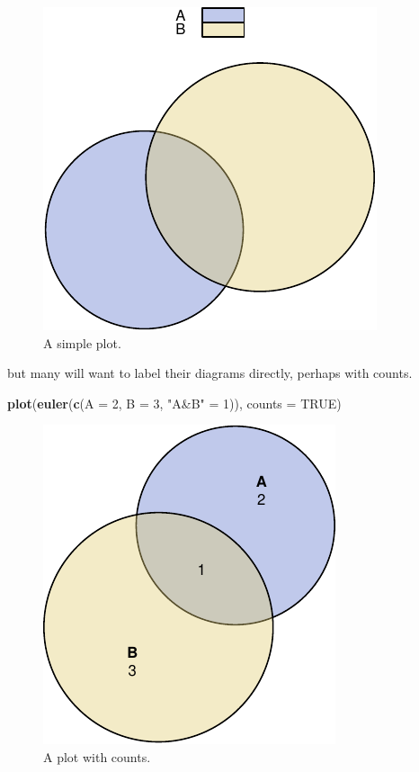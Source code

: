 \documentclass[
  headsepline=true,headings=standardclasses%
]{scrartcl}
\newenvironment{Shaded}{\begin{snugshade}}{\end{snugshade}}
\newcommand{\KeywordTok}[1]{\textcolor[rgb]{0.13,0.29,0.53}{\textbf{#1}}}
\newcommand{\DataTypeTok}[1]{\textcolor[rgb]{0.13,0.29,0.53}{#1}}
\newcommand{\DecValTok}[1]{\textcolor[rgb]{0.00,0.00,0.81}{#1}}
\newcommand{\StringTok}[1]{\textcolor[rgb]{0.31,0.60,0.02}{#1}}
\newcommand{\OtherTok}[1]{\textcolor[rgb]{0.56,0.35,0.01}{#1}}
\newcommand{\NormalTok}[1]{#1}
\theoremstyle{definition}
\theoremstyle{definition}
\theoremstyle{remark}
\begin{document}
\begin{figure}
\centering
\includegraphics{thesis_files/figure-latex/unnamed-chunk-10-1.pdf}
\caption{\label{fig:unnamed-chunk-10}A simple plot.}
\end{figure}

but many will want to label their diagrams directly, perhaps with
counts.

\begin{Shaded}
\begin{Highlighting}[]
\KeywordTok{plot}\NormalTok{(}\KeywordTok{euler}\NormalTok{(}\KeywordTok{c}\NormalTok{(}\DataTypeTok{A =} \DecValTok{2}\NormalTok{, }\DataTypeTok{B =} \DecValTok{3}\NormalTok{, }\StringTok{"A&B"}\NormalTok{ =}\StringTok{ }\DecValTok{1}\NormalTok{)), }\DataTypeTok{counts =} \OtherTok{TRUE}\NormalTok{)}
\end{Highlighting}
\end{Shaded}

\begin{figure}
\centering
\includegraphics{thesis_files/figure-latex/unnamed-chunk-11-1.pdf}
\caption{\label{fig:unnamed-chunk-11}A plot with counts.}
\end{figure}
\end{document}

